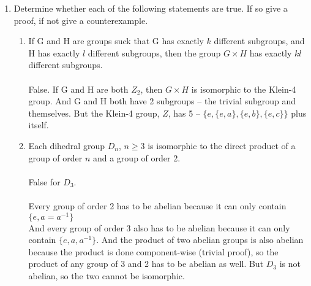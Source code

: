 
\usepackage{amsmath, dsfont}

\newenvironment{amatrix}[1]{%
  \left(\begin{array}{@{}*{#1}{c}|c@{}}
}{%
  \end{array}\right)
}

\makeatletter
\renewcommand*\env@matrix[1][*\c@MaxMatrixCols c]{%
  \hskip -\arraycolsep
  \let\@ifnextchar\new@ifnextchar
  \array{#1}}
\makeatother

\newcommand{\?}{\stackrel{?}{=}}



\pagestyle{myheadings}


\begin{enumerate}
\item Determine whether each of the following statements are true. If so give a proof, if not give a counterexample.
      \begin{enumerate}
      \item If G and H are groups suck that G has exactly $k$ different subgroups, and H has exactly $l$ different subgroups, then the group $G \times H$ has exactly $kl$ different subgroups.\\\\

      False. If G and H are both $Z_2$, then $G \times H$ is isomorphic to the Klein-4 group. And G and H both have 2 subgroups -- the trivial subgroup and themselves. But the Klein-4 group, $Z$, has 5 -- $\{e, \{e,a\}, \{e,b\}, \{e,c\}\}$ plus itself.\\

      \item Each dihedral group $D_n$, $n \geq 3$ is isomorphic to the direct product of a group of order $n$ and a group of order 2.\\\\

      False for $D_3$.\\\\
      Every group of order 2 has to be abelian because it can only contain $\{e, a = a^{-1}\}$\\
      And every group of order 3 also has to be abelian because it can only contain $\{e, a, a^{-1}\}$.
      And the product of two abelian groups is also abelian because the product is done component-wise (trivial proof), so the product of any group of 3 and 2 has to be abelian as well. But $D_3$ is not abelian, so the two cannot be isomorphic.\\
      \end{enumerate}


\end{enumerate}
